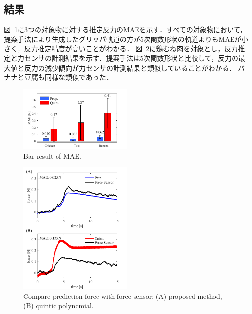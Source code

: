 \documentclass[a4paper]{jarticle}
\begin{document}
\subsection{結果}
図~\ref{fig:bar_result}に3つの対象物に対する推定反力のMAEを示す．すべての対象物において，提案手法により生成したグリッパ軌道の方が5次関数形状の軌道よりもMAEが小さく，反力推定精度が高いことがわかる．
図~\ref{fig:prop_quint}に鶏むね肉を対象とし，反力推定と力センサの計測結果を示す．提案手法は5次関数形状と比較して，反力の最大値と反力の減少傾向が力センサの計測結果と類似していることがわかる．
バナナと豆腐も同様な類似であった．
\begin{figure}[tb]
    \centering
    \includegraphics[width=0.5\textwidth]{bar_result.pdf}
    \caption{Bar result of MAE.}  
    \label{fig:bar_result}
\end{figure}
\begin{figure}[tb]
    \centering
    \includegraphics[width=0.5\textwidth]{prop_quint.pdf}
    \captionsetup{width=0.9\linewidth} %
    \caption{Compare prediction force with force sensor; (A) proposed method, (B) quintic polynomial.}
    \label{fig:prop_quint}
\end{figure}
\end{document}
